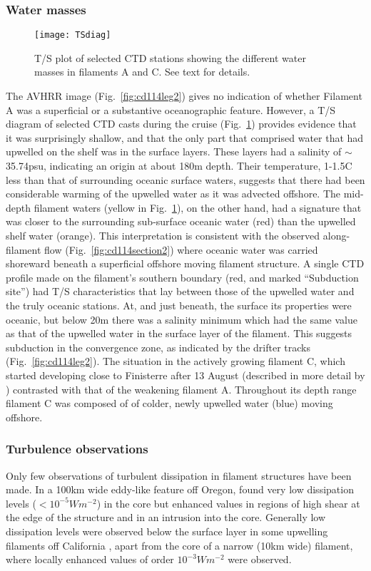 \subsubsection{Water masses}
\begin{figure}
\centering %
\texttt{[image: TSdiag]}%
\caption{T/S plot of selected CTD stations showing the different
water masses in filaments A and C. See text for details.}
\label{fig:cd114ts}
\end{figure}
The AVHRR image (Fig.~\ref{fig:cd114leg2}) gives no indication of
whether Filament A was a superficial or a substantive
oceanographic feature. However, a T/S diagram of selected CTD
casts during the cruise (Fig.~\ref{fig:cd114ts}) provides evidence
that it was surprisingly shallow, and that the only part that
comprised water that had upwelled on the shelf was in the surface
layers. These layers had a salinity of $\sim$35.74psu, indicating
an origin at about 180m depth. Their temperature, 1-1.5\deg C less
than that of surrounding oceanic surface waters, suggests that
there had been considerable warming of the upwelled water as it
was advected offshore.  The mid-depth filament waters (yellow in
Fig.~\ref{fig:cd114ts}), on the other hand, had a signature that
was closer to the surrounding sub-surface oceanic water (red) than
the upwelled shelf water (orange). This interpretation is
consistent with the observed along-filament flow
(Fig.~\ref{fig:cd114section2}) where oceanic water was carried
shoreward beneath a superficial offshore moving filament
structure. A single CTD profile made on the filament's southern
boundary (red, and marked ``Subduction site'') had T/S
characteristics that lay between those of the upwelled water and
the truly oceanic stations. At, and just beneath, the surface its
properties were oceanic, but below 20m there was a salinity
minimum which had the same value as that of the upwelled water in
the surface layer of the filament.  This suggests subduction in
the convergence zone, as indicated by the drifter tracks
(Fig.~\ref{fig:cd114leg2}).  The situation in the actively growing
filament C, which started developing close to Finisterre after 13
August (described in more detail by \citet{Smyth01}) contrasted
with that of the weakening filament A. Throughout its depth range
filament C was composed of of colder, newly upwelled water (blue)
moving offshore.

\subsubsection{Turbulence observations}
Only few observations of turbulent dissipation in filament
structures have been made.  In a 100km wide eddy-like feature off
Oregon, \citet{Moum88} found very low dissipation levels ($<
10^{-5} W m^{-2}$) in the core but enhanced values in regions of
high shear at the edge of the structure and in an intrusion into
the core. Generally low dissipation levels were observed below the
surface layer in some upwelling filaments off California
\citep{Dewey93}, apart from the core of a narrow (10km wide)
filament, where locally enhanced values of order $10^{-3} W
m^{-2}$ were observed.

